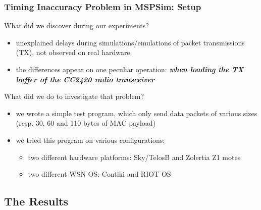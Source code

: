\documentclass[10pt,c]{beamer}
\renewcommand{\emph}[1]{\textbf{\textit{#1}}}
\begin{document}
\begin{frame}
\frametitle{Timing Inaccuracy Problem in MSPSim: Setup}
\begin{alertblock}{What did we discover during our experiments?}
\begin{itemize}
\item unexplained delays during simulations/emulations of packet
transmissions (TX), not observed on real hardware
\item the differences appear on one peculiar operation: \emph{when loading
the TX buffer of the CC2420 radio transceiver}
\end{itemize}
\end{alertblock}
\begin{block}{What did we do to investigate that problem?}
\begin{itemize}
\item we wrote a simple test program, which only send data packets of
various sizes (resp. 30, 60 and 110 bytes of MAC payload)
\item we tried this program on various configurations:
  \begin{itemize}
  \item two different hardware platforms: Sky/TelosB and Zolertia Z1 motes
  \item two different WSN OS: Contiki and RIOT OS
  \end{itemize}
\end{itemize}
\end{block}
\end{frame}

\subsection{The Results}
\end{document}
